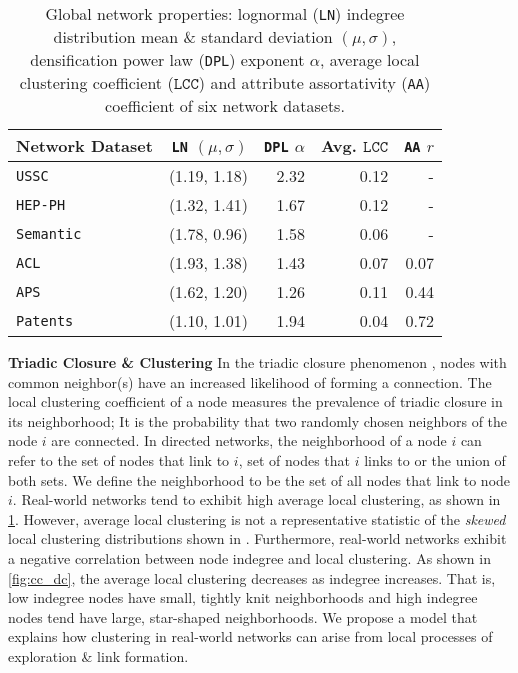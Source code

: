 \begin{table}
 \center
 {
  \begin{tabular}[c]{lrrrr} \toprule
  Network Dataset &  \texttt{LN} $(\mu, \sigma)$ & \texttt{DPL} $\alpha$       &  Avg. ${\texttt{LCC}}$  & \texttt{AA} $r$   \\ \midrule
  \texttt{USSC}     &   (1.19, 1.18) & 2.32     & 0.12    & -     \\
  \texttt{HEP-PH}   &   (1.32, 1.41) & 1.67     & 0.12    & -     \\
  \texttt{Semantic} &   (1.78, 0.96)  & 1.58     & 0.06    & -     \\   \midrule
  \texttt{ACL}      &   (1.93, 1.38)  & 1.43     & 0.07    & 0.07     \\
  \texttt{APS}      &   (1.62, 1.20)  & 1.26     & 0.11    & 0.44     \\
  \texttt{Patents}  &   (1.10, 1.01)   & 1.94     & 0.04    & 0.72    \\
   \bottomrule
  \end{tabular}
  \vspace{1mm}
  \caption{Global network properties: lognormal (\texttt{LN}) indegree distribution mean \& standard deviation $(\mu, \sigma)$,
  densification power law (\texttt{DPL}) exponent $\alpha$, average local clustering coefficient (${\texttt{LCC}}$)
  and attribute assortativity (\texttt{AA}) coefficient of six network datasets.}
  \label{table:netstats}
 }
\end{table}

\textbf{Triadic Closure \& Clustering}
In the triadic closure phenomenon \cite{simmel1950sociology,
newman2001clustering}, nodes with common neighbor(s) have an increased
likelihood of forming a connection.
The local clustering coefficient
of a node measures the prevalence of triadic closure in its neighborhood; It is
the probability that two randomly chosen neighbors of the node $i$ are
connected. In directed networks, the neighborhood of a node $i$ can refer to the
set of nodes that link to $i$, set of nodes that $i$ links to or the union of
both sets. We define the neighborhood to be the set of all nodes that link to
node $i$. Real-world networks tend to exhibit high average local clustering, as
shown in \cref{table:netstats}. However, average local clustering is not a
representative statistic of the \textit{skewed} local clustering distributions
shown in . Furthermore, real-world networks exhibit a negative
correlation between node indegree  and local clustering. As shown in
\cref{fig:cc_dc}, the average local clustering  decreases as indegree increases.
That is, low indegree nodes have small, tightly knit neighborhoods and high
indegree nodes tend have large, star-shaped neighborhoods. We propose a model
that explains how clustering in real-world networks can arise from local processes
of exploration \& link formation.

